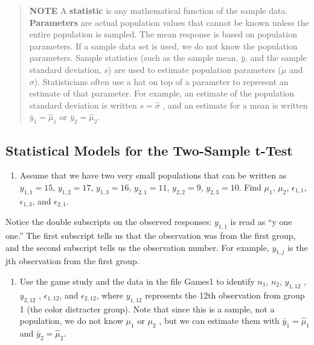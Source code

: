 \documentclass[
]{report}
\providecommand{\tightlist}{%
  \setlength{\itemsep}{0pt}\setlength{\parskip}{0pt}}
\begin{document}
\begin{quote}
\textbf{NOTE}
A \textbf{statistic} is any mathematical function of the sample data. \textbf{Parameters} are actual population values that cannot be known unless the entire population is sampled. The mean response is based on population parameters. If a sample data set is used, we do not know the population parameters. Sample statistics (such as the sample mean, \(\bar{y}\), and the sample standard deviation, \(s\)) are used to estimate population parameters (\(\mu\) and \(\sigma\)). Statisticians often use a hat on top of a parameter to represent an estimate of that parameter. For example, an estimate of the population standard deviation is written \(s = \hat{\sigma}\) , and an estimate for a mean is written \(\bar{y}_1 = \hat{\mu}_1\) or \(\bar{y}_2 = \hat{\mu}_2\).
\end{quote}

\hypertarget{statistical-models-for-the-two-sample-t-test}{%
\subsection{Statistical Models for the Two-Sample t-Test}\label{statistical-models-for-the-two-sample-t-test}}

\begin{enumerate}
\def\labelenumi{\arabic{enumi}.}
\setcounter{enumi}{4}
\tightlist
\item
  Assume that we have two very small populations that can be written as
  \(y_{1,1} = 15\), \(y_{1,2} = 17\), \(y_{1,3} = 16\), \(y_{2,1} = 11\), \(y_{2,2} = 9\), \(y_{2,3} = 10\). Find \(\mu_1\), \(\mu_2\), \(\epsilon_{1, 1}\), \(\epsilon_{1, 3}\), and \(\epsilon_{2, 1}\).
\end{enumerate}

Notice the double subscripts on the observed responses: \(y_{1,1}\) is read as ``y one one.'' The first subscript tells us that the observation was from the first group, and the second subscript tells us the observation number. For example, \(y_{1,j}\) is the jth observation from the first group.

\begin{enumerate}
\def\labelenumi{\arabic{enumi}.}
\setcounter{enumi}{5}
\tightlist
\item
  Use the game study and the data in the file Games1 to identify \(n_1\), \(n_2\), \(y_{1,12}\) , \(y_{2,12}\) , \(\epsilon_{1, 12}\), and \(\epsilon_{2, 12}\),
  where \(y_{1,12}\) represents the 12th observation from group 1 (the color distracter group). Note that since this is a sample, not a population, we do not know \(\mu_1\) or \(\mu_2\) , but we can estimate them with \(\bar{y}_1 = \hat{\mu}_1\) and \(\bar{y}_2 = \hat{\mu}_2\).
\end{enumerate}
\end{document}
